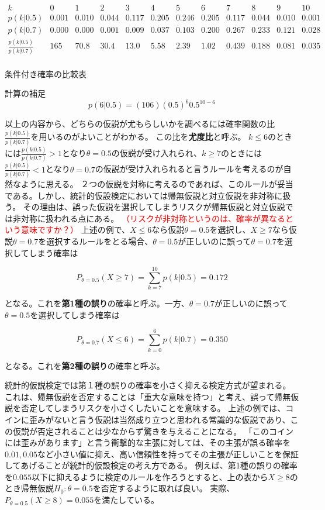 \documentclass{article}
\begin{document}
\begin{table}[h]
  \centering
  \[
  \begin{array}{c|ccccccccccc}
  k & 0 & 1 & 2 & 3 & 4 & 5 & 6 & 7 & 8 & 9 & 10 \\ \hline
  p(k|0.5) & 0.001 & 0.010 & 0.044 & 0.117 & 0.205 & 0.246 & 0.205 & 0.117 & 0.044 & 0.010 & 0.001 \\
  p(k|0.7) & 0.000 & 0.000 & 0.001 & 0.009 & 0.037 & 0.103 & 0.200 & 0.267 & 0.233 & 0.121 & 0.028 \\ \hline
  \frac{p(k|0.5)}{p(k|0.7)} & 165 & 70.8 & 30.4 & 13.0 & 5.58 & 2.39 & 1.02 & 0.439 & 0.188 & 0.081 & 0.035 \\ 
  \end{array}
  \]
  \caption{条件付き確率の比較表}
  \label{tab:probability_table}
\end{table}

計算の補足
$$
p(6|0.5)=(10 6) (0.5)^6 0.5^{10-6}
$$


以上の内容から、どちらの仮説が尤もらしいかを調べるには確率関数の比$\frac{p(k|0.5)}{p(k|0.7)}$を用いるのがよいことがわかる。
この比を\textbf{尤度比}と呼ぶ。
$k \leq 6$のときには$\frac{p(k|0.5)}{p(k|0.7)} >1$となり$\theta=0.5$の仮説が受け入れられ、$k \geq 7$のときには$\frac{p(k|0.5)}{p(k|0.7)}<1$となり$\theta = 0.7$の仮説が受け入れられると言うルールを考えるのが自然なように思える。
２つの仮説を対称に考えるのであれば、このルールが妥当である。しかし、統計的仮設検定においては帰無仮説と対立仮説を非対称に扱う。
その理由は、誤った仮説を選択してしまうリスクが帰無仮説と対立仮説では非対称に扱われる点にある。
\textcolor{red}{（リスクが非対称というのは、確率が異なるという意味ですか？）}
上述の例で、$X \leq 6$なら仮説$\theta=0.5$を選択し、$X \geq 7$なら仮説$\theta=0.7$を選択するルールをとる場合、$\theta=0.5$が正しいのに誤って$\theta=0.7$を選択してしまう確率は

$$
P_{\theta = 0.5}(X \geq 7) = \sum_{k=7}^{10} p(k|0.5)=0.172
$$

となる。これを\textbf{第1種の誤り}の確率と呼ぶ。一方、$\theta=0.7$が正しいのに誤って$\theta=0.5$を選択してしまう確率は

$$
P_{\theta = 0.7}(X \leq 6) = \sum_{k=0}^{6} p(k|0.7)=0.350
$$

となる。これを\textbf{第2種の誤り}の確率と呼ぶ。

統計的仮説検定では第１種の誤りの確率を小さく抑える検定方式が望まれる。
これは、帰無仮説を否定することは「重大な意味を持つ」と考え、誤って帰無仮説を否定してしまうリスクを小さくしたいことを意味する。
上述の例では、コインに歪みがないと言う仮説は当然成り立つと思われる常識的な仮説であり、この仮説が否定されることは少なからず驚きを与えることになる。
「このコインには歪みがあります」と言う衝撃的な主張に対しては、その主張が誤る確率を$0.01,0.05$など小さい値に抑え、高い信頼性を持ってその主張が正しいことを保証してあげることが統計的仮設検定の考え方である。
例えば、第1種の誤りの確率を$0.055$以下に抑えるように検定のルールを作ろうとすると、上の表から$X \geq 8$のとき帰無仮説$H_0:\theta=0.5$を否定するように取れば良い。
実際、$P_{\theta=0.5}(X \geq 8)=0.055$を満たしている。
\end{document}
